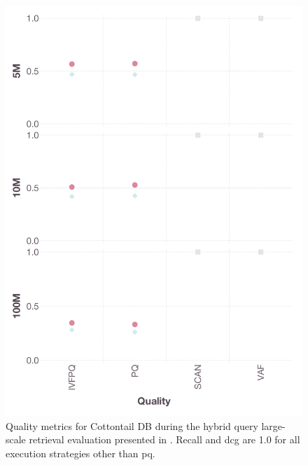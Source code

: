 \begin{figure}[p]
    \includegraphics[width=\linewidth]{figures/bignns-cottontail-Hybrid-quality}
    \caption{Quality metrics for Cottontail DB during the hybrid query large-scale retrieval evaluation presented in . Recall and \acrshort{dcg} are 1.0 for all execution strategies other than \acrshort{pq}.}
\end{figure}
